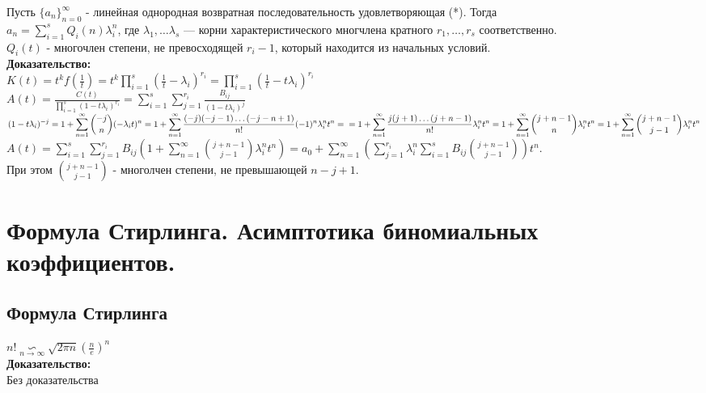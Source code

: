 \documentclass[12pt]{article}
\begin{document}
	Пусть $ \{ a_n \}_{n=0}^\infty$ - линейная однородная возвратная последовательность удовлетворяющая (*). Тогда\\
	$ \displaystyle a_n = \sum_{i=1}^s Q_i(n) \lambda_i^n$, где $\lambda_1, \ldots \lambda_s$ — корни характеристического многчлена кратного $r_1, \ldots ,r_s$ соответственно.\\
	$ Q_i(t)$ - многочлен степени, не превосходящей $r_i-1$, который находится из начальных условий.\\
	\textbf{Доказательство:}\\
	$ \displaystyle  K(t) = t^k f\left(\frac{1}{t}\right) = t^k \prod_{i=1}^s \left(\frac{1}{t} - \lambda_i\right)^{r_i} 
	= \prod_{i=1}^s \left(\frac{1}{t} - t\lambda_i\right)^{r_i} $\\
	$ \displaystyle  A(t) = \frac{C(t)}{ \displaystyle \prod_{i=1}^s (1 - t\lambda_i)^{r_i}} =
	\sum_{i=1}^s \sum_{j=1}^{r_i} \frac{B_{ij}}{ (1 - t \lambda_i)^j }$\\
	$  \displaystyle (1 - t\lambda_i)^{-j} = 1 + \sum_{n=1}^\infty \binom{-j}{n} (-\lambda_i t)^n =
	1 + \sum_{n=1}^\infty \frac{(-j)(-j-1) \ldots (-j-n+1)}{n!} (-1)^n \lambda_i^n t^n =\\=
	1 + \sum_{n=1}^\infty \frac{j(j+1) \ldots (j+n-1)}{n!} \lambda_i^n t^n =
	1 + \sum_{n=1}^\infty \binom{j+n-1}{n} \lambda_i^n t^n = 1 + \sum_{n=1}^\infty \binom{j+n-1}{j-1} \lambda_i^n t^n$\\
	$ \displaystyle A(t) = \sum_{i=1}^s \sum_{j=1}^{r_i} B_{ij}\left( 1 + \sum_{n=1}^\infty \binom{j+n-1}{j-1} \lambda_i^n t^n \right) =
	a_0 + \sum_{n=1}^\infty \left( \sum_{j=1}^{r_i} \lambda_i^n \sum_{i=1}^{s} B_{ij} \binom{j+n-1}{j-1} \right) t^n$.\\
	При этом $\binom{j+n-1}{j-1}$ - многолчен степени, не превышающей $n-j+1$.\\
	\qedsymbol

\section{Формула Стирлинга. Асимптотика биномиальных коэффициентов.}
\subsection{Формула Стирлинга}
	$n! \underset{n\to\infty}{\backsim} \sqrt{2\pi n}(\frac{n}{e})^n$\\
	\textbf{Доказательство:}\\
		Без доказательства\\
	\qedsymbol
\end{document}
